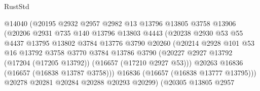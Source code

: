 \begin{lexlean}{RustStd}
\begin{coremodule}
                                @14040
                                (@20195
                                  @2932
                                  @2957
                                  @2982
                                  @13
                                  @13796
                                  @13805
                                  @3758
                                  @13906
                                  (@20206
                                    @2931
                                    @735
                                    @140
                                    @13796
                                    @13803
                                    @4443
                                    (@20238
                                      @2930
                                      @53
                                      @55
                                      @4437
                                      @13795
                                      @13802
                                      @3784
                                      @13776
                                      @3790
                                      @20260
                                      (@20214
                                        @2928
                                        @101
                                        @53
                                        @16
                                        @13792
                                        @3758
                                        @3770
                                        @3784
                                        @13786
                                        @3790
                                        (@20227
                                          @2927
                                          @13792
                                          (@17204 (@17205 @13792))
                                          (@16657 (@17210 @2927 @53)))
                                        @20263
                                        @16836
                                        (@16657 (@16838 @13787 @3758)))
                                      @16836
                                      (@16657 (@16838 @13777 @13795)))
                                    @20278
                                    @20281
                                    @20284
                                    @20288
                                    @20293
                                    @20299)
                                  (@20305
                                    @13805
                                    @2957

\end{coremodule}
\end{lexlean}
